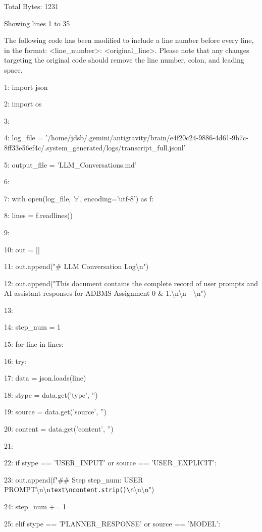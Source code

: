 \documentclass[11pt,a4paper]{article}
\begin{document}
{Total Bytes: 1231

Showing lines 1 to 35

The following code has been modified to include a line number before every line, in the format: <line\_number>: <original\_line>. Please note that any changes targeting the original code should remove the line number, colon, and leading space.

1: import json

2: import os

3:

4: log\_file = '/home/jdsb/.gemini/antigravity/brain/e4f20c24-9886-4d61-9b7c-8ff33e56ef4c/.system\_generated/logs/transcript\_full.jsonl'

5: output\_file = 'LLM\_Conversations.md'

6:

7: with open(log\_file, 'r', encoding='utf-8') as f:

8:     lines = f.readlines()

9:

10: out = []

11: out.append("\# LLM Conversation Log\textbackslash{}n")

12: out.append("This document contains the complete record of user prompts and AI assistant responses for ADBMS Assignment 0 \& 1.\textbackslash{}n\textbackslash{}n---\textbackslash{}n")

13:

14: step\_num = 1

15: for line in lines:

16:     try:

17:         data = json.loads(line)

18:         stype = data.get('type', '')

19:         source = data.get('source', '')

20:         content = data.get('content', '')

21:

22:         if stype == 'USER\_INPUT' or source == 'USER\_EXPLICIT':

23:             out.append(f"\#\# Step {step\_num}: USER PROMPT\textbackslash{}n\textbackslash{}n\texttt{}\texttt{text\textbackslash{}n{content.strip()}\textbackslash{}n}\texttt{}\textbackslash{}n\textbackslash{}n")

24:             step\_num += 1

25:         elif stype == 'PLANNER\_RESPONSE' or source == 'MODEL':

}
\end{document}
